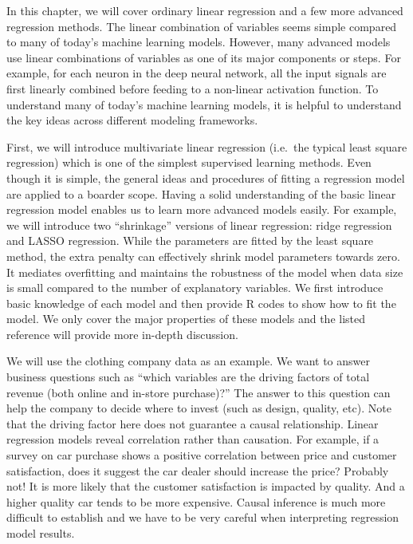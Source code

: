 \documentclass[12pt,]{krantz}
\begin{document}
In this chapter, we will cover ordinary linear regression and a few more advanced regression methods. The linear combination of variables seems simple compared to many of today's machine learning models. However, many advanced models use linear combinations of variables as one of its major components or steps. For example, for each neuron in the deep neural network, all the input signals are first linearly combined before feeding to a non-linear activation function. To understand many of today's machine learning models, it is helpful to understand the key ideas across different modeling frameworks.

First, we will introduce multivariate linear regression (i.e.~the typical least square regression) which is one of the simplest supervised learning methods. Even though it is simple, the general ideas and procedures of fitting a regression model are applied to a boarder scope. Having a solid understanding of the basic linear regression model enables us to learn more advanced models easily. For example, we will introduce two ``shrinkage'' versions of linear regression: ridge regression and LASSO regression. While the parameters are fitted by the least square method, the extra penalty can effectively shrink model parameters towards zero. It mediates overfitting and maintains the robustness of the model when data size is small compared to the number of explanatory variables. We first introduce basic knowledge of each model and then provide R codes to show how to fit the model. We only cover the major properties of these models and the listed reference will provide more in-depth discussion.

We will use the clothing company data as an example. We want to answer business questions such as ``which variables are the driving factors of total revenue (both online and in-store purchase)?'' The answer to this question can help the company to decide where to invest (such as design, quality, etc). Note that the driving factor here does not guarantee a causal relationship. Linear regression models reveal correlation rather than causation. For example, if a survey on car purchase shows a positive correlation between price and customer satisfaction, does it suggest the car dealer should increase the price? Probably not! It is more likely that the customer satisfaction is impacted by quality. And a higher quality car tends to be more expensive. Causal inference is much more difficult to establish and we have to be very careful when interpreting regression model results.
\end{document}
